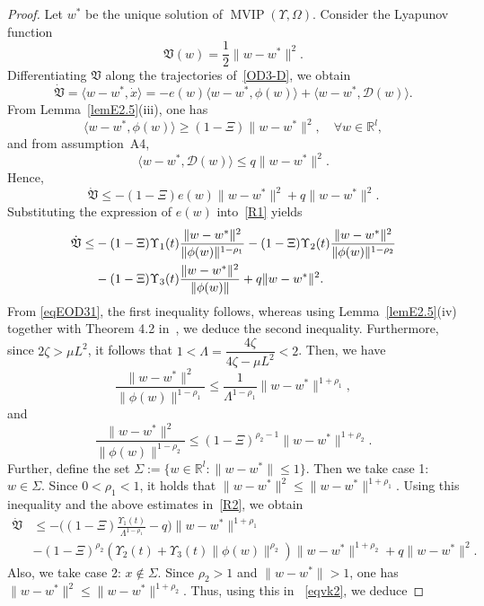 \documentclass{article}
\theoremstyle{plain}%
\theoremstyle{thmstyletwo}%
\theoremstyle{thmstylethree}%
\begin{document}
\begin{proof}
Let $w^*$ be the unique solution of $\operatorname{MVIP}(\Upsilon,\Omega)$. Consider the Lyapunov function
\[
\mathfrak{V}(w)=\frac12\|w-w^*\|^2.
\]
Differentiating $\mathfrak V$ along the trajectories of~\eqref{OD3-D}, we obtain
\[
\dot{\mathfrak V}
=
\langle w-w^*,\dot x\rangle
=
- e(w)\langle w-w^*,\phi(w)\rangle
+\langle w-w^*,\mathcal D(w)\rangle.
\]
From Lemma~\ref{lemE2.5}(iii), one has
\[
\langle w-w^*,\phi(w)\rangle
\ge (1-\Xi)\|w-w^*\|^2,
\quad \forall w\in\mathbb{R}^l,
\]
and from assumption~A4,
\[
\langle w-w^*,\mathcal D(w)\rangle
\le q\|w-w^*\|^2.
\]
Hence,
\begin{equation}\label{R1}
   \dot{\mathfrak V}
\le
-(1-\Xi)e(w)\|w-w^*\|^2
+q\|w-w^*\|^2. 
\end{equation}
Substituting the expression of $e(w)$ into~\eqref{R1} yields
\begin{align}\label{R2}
\notag\dot{\mathfrak V}\le&
-(1-\Xi)\Upsilon_1(t)\frac{\|w-w^*\|^2}{\|\phi(w)\|^{1-\rho_1}}
-(1-\Xi)\Upsilon_2(t)\frac{\|w-w^*\|^2}{\|\phi(w)\|^{1-\rho_2}}\\
&-(1-\Xi)\Upsilon_3(t)\frac{\|w-w^*\|^2}{\|\phi(w)\|}
+q\|w-w^*\|^2.
\end{align}
From \eqref{eqEOD31}, the first inequality follows, whereas using Lemma~\eqref{lemE2.5}(iv) together with Theorem 4.2 in~\cite{25}, we deduce the second inequality. Furthermore, since $2\zeta > \mu L^{2}$, it follows that $1 < \Lambda = \dfrac{4\zeta}{4\zeta - \mu L^{2}} < 2$. Then, we have
\[
\frac{\|w-w^*\|^2}{\|\phi(w)\|^{1-\rho_1}}
\le
\frac{1}{\Lambda^{1-\rho_1}}\|w-w^*\|^{1+\rho_1},
\]
and
\[
\frac{\|w-w^*\|^2}{\|\phi(w)\|^{1-\rho_2}}
\le
(1-\Xi)^{\rho_2-1}\|w-w^*\|^{1+\rho_2}.
\]
Further, define the set
\(
\Sigma:=\{w \in\mathbb{R}^l:\|w-w^*\|\le1\}.
\) Then we take case 1: $w \in\Sigma$.
Since $0<\rho_1<1$, it holds that
\(
\|w-w^*\|^2\le \|w-w^*\|^{1+\rho_1}.
\)
Using this inequality and the above estimates in~\eqref{R2}, we obtain
\begin{equation}\label{eqvk2}
    \begin{split}
   \dot{\mathfrak V}
&\le
-\Big((1-\Xi)\frac{\Upsilon_1(t)}{\Lambda^{1-\rho_1}}-q\Big)
\|w-w^*\|^{1+\rho_1}
\\&- (1- \Xi)^{\rho_2} \left( \Upsilon_2(t) + \Upsilon_3(t) \|\phi(w)\|^{\rho_2}\right) \|w - w^*\|^{1+\rho_2}+q\|w - w^*\|^{2}.     
    \end{split}
\end{equation}
Also, we take case 2: $x\notin\Sigma$. Since $\rho_2>1$ and $\|w-w^*\|>1$, one has
\(
\|w-w^*\|^2\le \|w-w^*\|^{1+\rho_2}.
\)
Thus, using this in ~\eqref{eqvk2}, we deduce



\end{proof}
\end{document}
